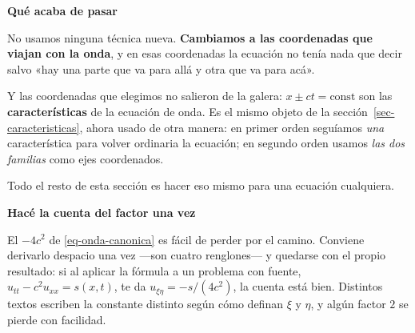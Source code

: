 \documentclass[
  spanish,
  a4paper,
]{scrbook}
\theoremstyle{definition}
\theoremstyle{plain}
\theoremstyle{definition}
\theoremstyle{plain}
\theoremstyle{definition}
\theoremstyle{remark}
\begin{document}
\begin{tcolorbox}[enhanced jigsaw, arc=.35mm, bottomrule=.15mm, breakable, colback=white, colframe=quarto-callout-important-color-frame, left=2mm, leftrule=.75mm, opacityback=0, rightrule=.15mm, toprule=.15mm]
\begin{minipage}[t]{5.5mm}
\textcolor{quarto-callout-important-color}{\faExclamation}
\end{minipage}%
\begin{minipage}[t]{\textwidth - 5.5mm}

\vspace{-3mm}\textbf{Qué acaba de pasar}\vspace{3mm}

No usamos ninguna técnica nueva. \textbf{Cambiamos a las coordenadas que
viajan con la onda}, y en esas coordenadas la ecuación no tenía nada que
decir salvo «hay una parte que va para allá y otra que va para acá».

Y las coordenadas que elegimos no salieron de la galera:
\(x \pm ct = \text{const}\) son las \textbf{características} de la
ecuación de onda. Es el mismo objeto de la
sección~\ref{sec-caracteristicas}, ahora usado de otra manera: en primer
orden seguíamos \emph{una} característica para volver ordinaria la
ecuación; en segundo orden usamos \emph{las dos familias} como ejes
coordenados.

Todo el resto de esta sección es hacer eso mismo para una ecuación
cualquiera.

\end{minipage}%
\end{tcolorbox}

\begin{tcolorbox}[enhanced jigsaw, arc=.35mm, bottomrule=.15mm, breakable, colback=white, colframe=quarto-callout-warning-color-frame, left=2mm, leftrule=.75mm, opacityback=0, rightrule=.15mm, toprule=.15mm]
\begin{minipage}[t]{5.5mm}
\textcolor{quarto-callout-warning-color}{\faExclamationTriangle}
\end{minipage}%
\begin{minipage}[t]{\textwidth - 5.5mm}

\vspace{-3mm}\textbf{Hacé la cuenta del factor una vez}\vspace{3mm}

El \(-4c^2\) de \ref{eq-onda-canonica} es fácil de perder por el camino.
Conviene derivarlo despacio una vez ---son cuatro renglones--- y
quedarse con el propio resultado: si al aplicar la fórmula a un problema
con fuente, \(u_{tt}-c^2u_{xx} = s(x,t)\), te da
\(u_{\xi\eta} = -s/(4c^2)\), la cuenta está bien. Distintos textos
escriben la constante distinto según cómo definan \(\xi\) y \(\eta\), y
algún factor \(2\) se pierde con facilidad.

\end{minipage}%
\end{tcolorbox}
\end{document}

